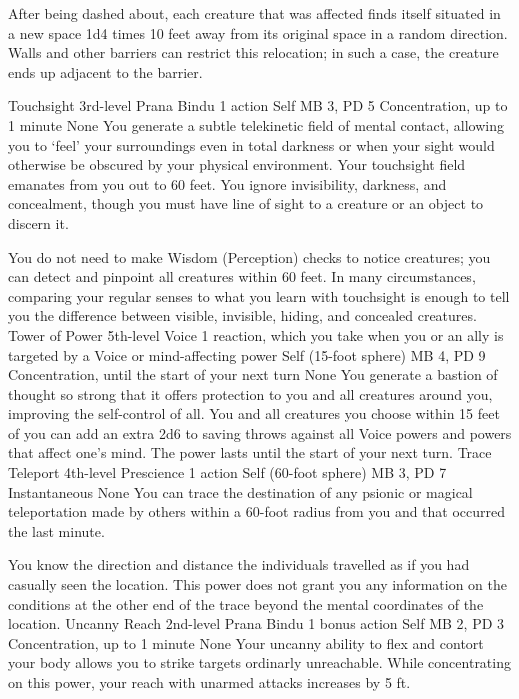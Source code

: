 After being dashed about, each creature that was affected
finds itself situated in a new space 1d4 times 10 feet away
from its original space in a random direction. Walls and other
barriers can restrict this relocation; in such a case, the
creature ends up adjacent to the barrier.

\DndPowerHeader%
    {Touchsight\label{pwr:touchsight}}
    {3rd-level Prana Bindu}
    {1 action}
    {Self}
    {MB 3, PD 5}
    {Concentration, up to 1 minute}
    {None}
You generate a subtle telekinetic field of
mental contact, allowing you to `feel' your surroundings
even in total darkness or when your sight would otherwise
be obscured by your physical environment. Your touchsight
field emanates from you out to 60 feet. You ignore invisibility,
darkness, and concealment, though you must have line of sight
to a creature or an object to discern it.

You do not need to make Wisdom (Perception) checks to notice
creatures; you can detect and pinpoint all creatures within
60 feet. In many circumstances, comparing your regular senses
to what you learn with touchsight is enough to tell you the
difference between visible, invisible, hiding, and concealed
creatures.
\DndPowerHeader%
    {Tower of Power\label{pwr:tower_of_power}}
    {5th-level Voice}
    {1 reaction, which you take when you or an ally is targeted by a Voice or mind-affecting power}
    {Self (15-foot sphere)}
    {MB 4, PD 9}
    {Concentration, until the start of your next turn}
    {None}
You generate a bastion of thought so strong
that it offers protection to you and all creatures around
you, improving the self-control of all. You and all creatures
you choose within 15 feet of you can add an extra 2d6 to saving
throws against all Voice powers and powers that affect one's
mind. The power lasts until the start of your next turn.
\DndPowerHeader%
    {Trace Teleport\label{pwr:trace_teleport}}
    {4th-level Prescience}
    {1 action}
    {Self (60-foot sphere)}
    {MB 3, PD 7}
    {Instantaneous}
    {None}
You can trace the destination of any psionic or magical
teleportation made by others within a 60-foot radius from
you and that occurred the last minute.

You know the direction and distance the individuals travelled
as if you had casually seen the location. This power does
not grant you any information on the conditions at the other
end of the trace beyond the mental coordinates of the location.
\DndPowerHeader%
    {Uncanny Reach\label{pwr:uncanny_reach}}
    {2nd-level Prana Bindu}
    {1 bonus action}
    {Self}
    {MB 2, PD 3}
    {Concentration, up to 1 minute}
    {None}
Your uncanny ability to flex and contort your body allows you
to strike targets ordinarly unreachable.
While concentrating on this power, your reach with unarmed attacks
increases by 5 ft.


